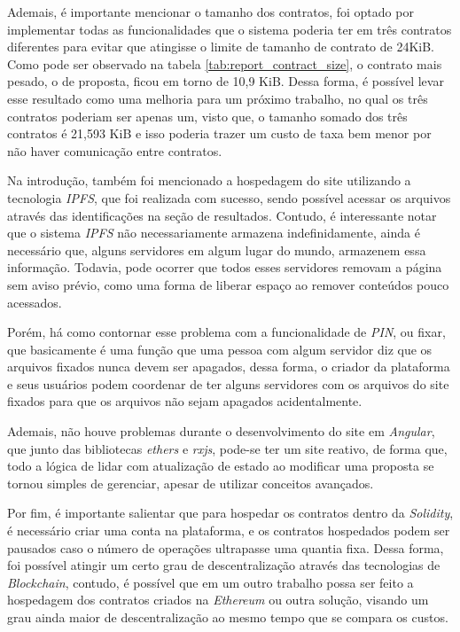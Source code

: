 Ademais, é importante mencionar o tamanho dos contratos, foi optado por implementar todas as funcionalidades que o sistema poderia ter em três contratos diferentes para evitar que atingisse o limite de tamanho de contrato de 24KiB. Como pode ser observado na tabela \ref{tab:report_contract_size}, o contrato mais pesado, o de proposta, ficou em torno de 10,9 KiB. Dessa forma, é possível levar esse resultado como uma melhoria para um próximo trabalho, no qual os três contratos poderiam ser apenas um, visto que, o tamanho somado dos três contratos é 21,593 KiB e isso poderia trazer um custo de taxa bem menor por não haver comunicação entre contratos.

Na introdução, também foi mencionado a hospedagem do site utilizando a tecnologia \textit{IPFS}, que foi realizada com sucesso, sendo possível acessar os arquivos através das identificações na seção de resultados.
Contudo, é interessante notar que o sistema \textit{IPFS} não necessariamente armazena indefinidamente, ainda é necessário que, alguns servidores em algum lugar do mundo, armazenem essa informação. Todavia, pode ocorrer que todos esses servidores removam a página sem aviso prévio, como uma forma de liberar espaço ao remover conteúdos pouco acessados. 

Porém, há como contornar esse problema com a funcionalidade de \textit{PIN}, ou fixar, que basicamente é uma função que uma pessoa com algum servidor diz que os arquivos fixados nunca devem ser apagados, dessa forma, o criador da plataforma e seus usuários podem coordenar de ter alguns servidores com os arquivos do site fixados para que os arquivos não sejam apagados acidentalmente.

Ademais, não houve problemas durante o desenvolvimento do site em \textit{Angular}, que junto das bibliotecas \textit{ethers} e \textit{rxjs}, pode-se ter um site reativo, de forma que, todo a lógica de lidar com atualização de estado ao modificar uma proposta se tornou simples de gerenciar, apesar de utilizar conceitos avançados.

Por fim, é importante salientar que para hospedar os contratos dentro da \textit{Solidity}, é necessário criar uma conta na plataforma, e os contratos hospedados podem ser pausados caso o número de operações ultrapasse uma quantia fixa. Dessa forma, foi possível atingir um certo grau de descentralização através das tecnologias de \textit{Blockchain}, contudo, é possível que em um outro trabalho possa ser feito a hospedagem dos contratos criados na \textit{Ethereum} ou outra solução, visando um grau ainda maior de descentralização ao mesmo tempo que se compara os custos.

